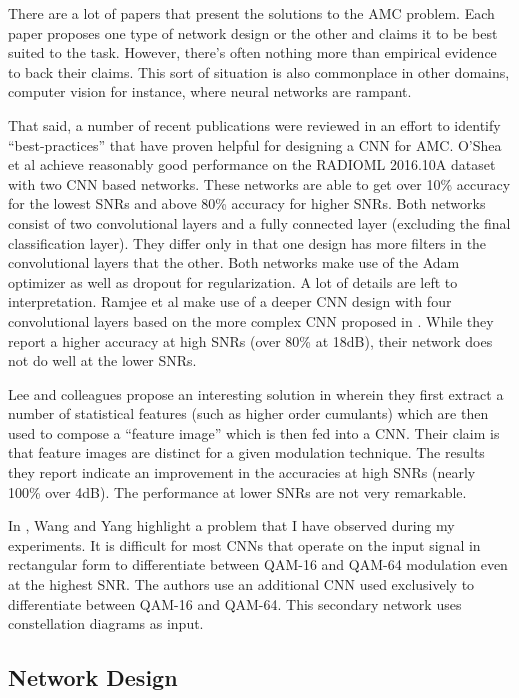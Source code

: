 \documentclass[journal,onecolumn]{IEEEtran}
\begin{document}
There are a lot of papers that present the solutions to the AMC problem. Each paper proposes one type of network design or the other and claims it to be best suited to the task. However, there’s often nothing more than empirical evidence to back their claims. This sort of situation is also commonplace in other domains, computer vision for instance, where neural networks are rampant.

That said, a number of recent publications were reviewed in an effort to identify “best-practices” that have proven helpful for designing a CNN for AMC. O’Shea et al \cite{cnn2} achieve reasonably good performance on the RADIOML 2016.10A dataset with two CNN based networks. These networks are able to get over 10\% accuracy for the lowest SNRs and above 80\% accuracy for higher SNRs. Both networks consist of two convolutional layers and a fully connected layer (excluding the final classification layer). They differ only in that one design has more filters in the convolutional layers that the other. Both networks make use of the Adam optimizer as well as dropout for regularization. A lot of details are left to interpretation. Ramjee et al \cite{cnn1} make use of a deeper CNN design with four convolutional layers based on the more complex CNN proposed in \cite{cnn2}. While they report a higher accuracy at high SNRs (over 80\% at 18dB), their network does not do well at the lower SNRs. 

Lee and colleagues propose an interesting solution in \cite{featImage} wherein they first extract a number of statistical features (such as higher order cumulants) which are then used to compose a “feature image” which is then fed into a CNN. Their claim is that feature images are distinct for a given modulation technique. The results they report indicate an improvement in the accuracies at high SNRs (nearly 100\% over 4dB). The performance at lower SNRs are not very remarkable.

In \cite{ddriven}, Wang and Yang highlight a problem that I have observed during my experiments. It is difficult for most CNNs that operate on the input signal in rectangular form to differentiate between QAM-16 and QAM-64 modulation even at the highest SNR. The authors use an additional CNN used exclusively to differentiate between QAM-16 and QAM-64. This secondary network uses constellation diagrams as input.

\subsection{Network Design}
\end{document}
